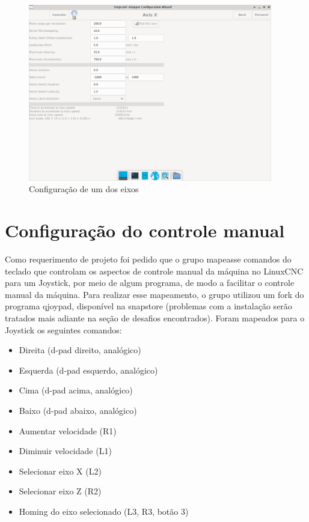 \begin{figure}[H]
    \begin{center}
        \includegraphics[width=0.95\textwidth]{images/prog/eixo.png}   
    \end{center}
    \caption{Configuração de um dos eixos}\label{eixos}
\end{figure}

\section{Configuração do controle manual}

Como requerimento de projeto foi pedido que o grupo mapeasse comandos do teclado que controlam os aspectos de controle manual da máquina no LinuxCNC para um Joystick, por meio de algum programa, de modo a facilitar o controle manual da máquina. Para realizar esse mapeamento, o grupo utilizou um fork do programa qjoypad, disponível na snapstore (problemas com a instalação serão tratados mais adiante na seção de desafios encontrados).
Foram mapeados para o Joystick os seguintes comandos:

\begin{itemize}
    \item Direita (d-pad direito, analógico) 
    \item Esquerda (d-pad esquerdo, analógico)
    \item Cima (d-pad acima, analógico)
    \item Baixo (d-pad abaixo, analógico)
    \item Aumentar velocidade (R1) 
    \item Diminuir velocidade (L1)
    \item Selecionar eixo X (L2)
    \item Selecionar eixo Z (R2)
    \item Homing do eixo selecionado (L3, R3, botão 3)
\end{itemize}

